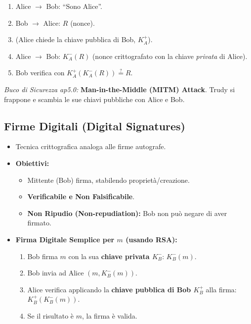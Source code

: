 \begin{itemize}
\begin{enumerate}
        \item Alice $\rightarrow$ Bob: \textquotedblleft Sono Alice\textquotedblright{}.
        \item Bob $\rightarrow$ Alice: $R$ (nonce).
        \item (Alice chiede la chiave pubblica di Bob, $K_A^+$).
        \item Alice $\rightarrow$ Bob: $K_A^-(R)$ (nonce crittografato con la chiave \textit{privata} di Alice).
        \item Bob verifica con $K_A^+(K_A^-(R)) \stackrel{?}{=} R$.
    \end{enumerate}
    \textit{Buco di Sicurezza ap5.0:} \textbf{Man-in-the-Middle (MITM) Attack}. Trudy si frappone e scambia le sue chiavi pubbliche con Alice e Bob.
\end{itemize}

\subsection{Firme Digitali (Digital Signatures)}
\begin{itemize}
    \item Tecnica crittografica analoga alle firme autografe.
    \item \textbf{Obiettivi:}
    \begin{itemize}
        \item Mittente (Bob) firma, stabilendo proprietà/creazione.
        \item \textbf{Verificabile e Non Falsificabile}.
        \item \textbf{Non Ripudio (Non-repudiation):} Bob non può negare di aver firmato.
    \end{itemize}
    \item \textbf{Firma Digitale Semplice per $m$ (usando RSA):}
    \begin{enumerate}
        \item Bob firma $m$ con la sua \textbf{chiave privata $K_B^-$}: $K_B^-(m)$.
        \item Bob invia ad Alice $(m, K_B^-(m))$.
        \item Alice verifica applicando la \textbf{chiave pubblica di Bob $K_B^+$} alla firma: $K_B^+(K_B^-(m))$.
        \item Se il risultato è $m$, la firma è valida.
    \end{enumerate}
\end{itemize}

